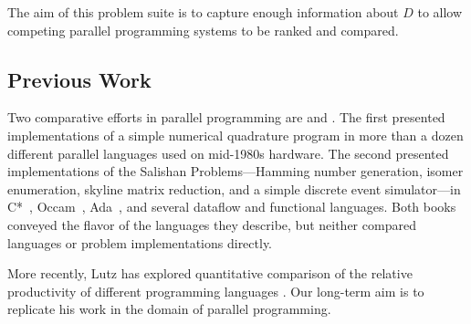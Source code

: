 The aim of this problem suite is to capture enough information about $D$
to allow competing parallel programming systems to be ranked and compared.

\subsection{Previous Work\label{s:previous}}

Two comparative efforts in parallel programming are \cite{b:babb-cases} and \cite{b:salishan}.
The first presented implementations of a simple numerical quadrature program
in more than a dozen different parallel languages used on mid-1980s hardware.
The second presented implementations of
the Salishan Problems---Hamming number generation,
isomer enumeration,
skyline matrix reduction,
and a simple discrete event simulator---in
C*~\cite{b:dataparallel-c}, Occam~\cite{b:occam}, Ada~\cite{b:ada},
and several dataflow and functional languages.
Both books conveyed the flavor of the languages they describe,
but neither compared languages or problem implementations directly.

More recently,
Lutz has explored quantitative comparison of the relative productivity
of different programming languages \cite{b:prechelt-languages,b:prechelt-platforms}.
Our long-term aim is to replicate his work in the domain of parallel programming.
